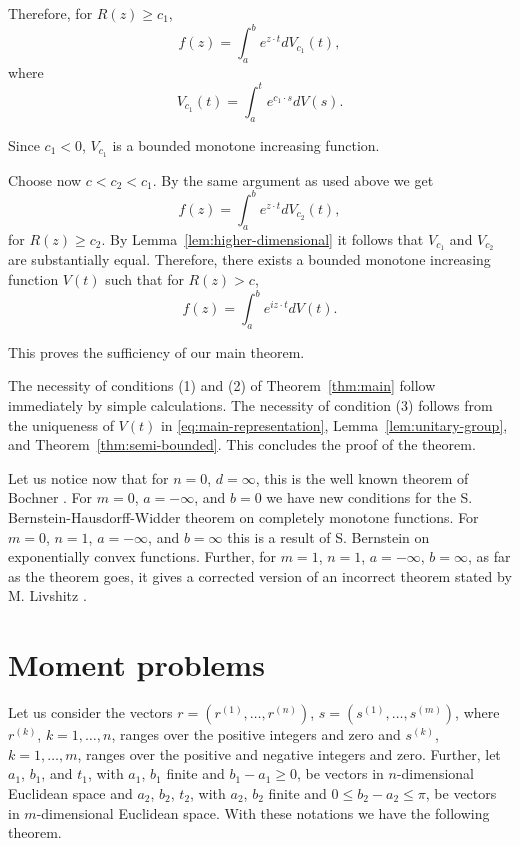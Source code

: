 \documentclass{article}
\begin{document}
Therefore, for $R(z) \geq c_1$,
\begin{equation}
f(z) = \int_a^b e^{z \cdot t} dV_{c_1}(t),
\label{eq:sufficiency-step4}
\end{equation}
where
\begin{equation}
V_{c_1}(t) = \int_a^t e^{c_1 \cdot s} dV(s).
\label{eq:sufficiency-step5}
\end{equation}

Since $c_1 < 0$, $V_{c_1}$ is a bounded monotone increasing function.

Choose now $c < c_2 < c_1$. By the same argument as used above we get
\begin{equation}
f(z) = \int_a^b e^{z \cdot t} dV_{c_2}(t),
\label{eq:sufficiency-step6}
\end{equation}
for $R(z) \geq c_2$. By Lemma~\ref{lem:higher-dimensional} it follows that $V_{c_1}$ and $V_{c_2}$ are substantially equal. Therefore, there exists a bounded monotone increasing function $V(t)$ such that for $R(z) > c$,
\begin{equation}
f(z) = \int_a^b e^{iz \cdot t} dV(t).
\label{eq:sufficiency-conclusion}
\end{equation}

This proves the sufficiency of our main theorem.

The necessity of conditions (1) and (2) of Theorem~\ref{thm:main} follow immediately by simple calculations. The necessity of condition (3) follows from the uniqueness of $V(t)$ in \eqref{eq:main-representation}, Lemma~\ref{lem:unitary-group}, and Theorem~\ref{thm:semi-bounded}. This concludes the proof of the theorem.

Let us notice now that for $n = 0$, $d = \infty$, this is the well known theorem of Bochner \cite{bochner}. For $m = 0$, $a = -\infty$, and $b = 0$ we have new conditions for the S. Bernstein-Hausdorff-Widder theorem on completely monotone functions. For $m = 0$, $n = 1$, $a = -\infty$, and $b = \infty$ this is a result of S. Bernstein on exponentially convex functions. Further, for $m = 1$, $n = 1$, $a = -\infty$, $b = \infty$, as far as the theorem goes, it gives a corrected version of an incorrect theorem stated by M. Livshitz \cite{livshitz}.

\section{Moment problems}
\label{sec:moment-problems}

Let us consider the vectors $r = (r^{(1)}, \ldots, r^{(n)})$, $s = (s^{(1)}, \ldots, s^{(m)})$, where $r^{(k)}$, $k = 1, \ldots, n$, ranges over the positive integers and zero and $s^{(k)}$, $k = 1, \ldots, m$, ranges over the positive and negative integers and zero. Further, let $a_1$, $b_1$, and $t_1$, with $a_1$, $b_1$ finite and $b_1 - a_1 \geq 0$, be vectors in $n$-dimensional Euclidean space and $a_2$, $b_2$, $t_2$, with $a_2$, $b_2$ finite and $0 \leq b_2 - a_2 \leq \pi$, be vectors in $m$-dimensional Euclidean space. With these notations we have the following theorem.
\end{document}
